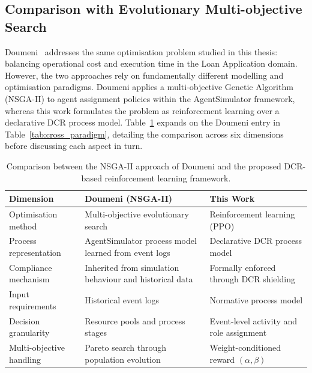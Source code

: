 \subsection{Comparison with Evolutionary Multi-objective Search}
\label{sec:discussion_doumeni}

Doumeni~\cite{ArtemisDoumeniParetoAgentSimulator} addresses the same optimisation problem studied in this thesis: balancing operational cost and execution time in the Loan Application domain. However, the two approaches rely on fundamentally different modelling and optimisation paradigms. Doumeni applies a multi-objective Genetic Algorithm (NSGA-II) to agent assignment policies within the AgentSimulator framework, whereas this work formulates the problem as reinforcement learning over a declarative \ac{DCR} process model. Table~\ref{tab:doumeni_comparison} expands on the Doumeni entry in Table~\ref{tab:cross_paradigm}, detailing the comparison across six dimensions before discussing each aspect in turn.

\begin{table}[H]
\centering
\caption{Comparison between the NSGA-II approach of Doumeni and the proposed DCR-based reinforcement learning framework.}
\label{tab:doumeni_comparison}

{\renewcommand{\arraystretch}{1.5}

\begin{tabularx}{\linewidth}{l p{4.2cm} p{4.2cm}}
\toprule
\textbf{Dimension} & \textbf{Doumeni (NSGA-II)} & \textbf{This Work} \\
\midrule

Optimisation method &
Multi-objective evolutionary search &
Reinforcement learning (PPO) \\

Process representation &
AgentSimulator process model learned from event logs &
Declarative DCR process model \\

Compliance mechanism &
Inherited from simulation behaviour and historical data &
Formally enforced through DCR shielding \\

Input requirements &
Historical event logs &
Normative process model \\

Decision granularity &
Resource pools and process stages &
Event-level activity and role assignment \\

Multi-objective handling &
Pareto search through population evolution &
Weight-conditioned reward $(\alpha,\beta)$ \\

\bottomrule
\end{tabularx}}
\end{table}

